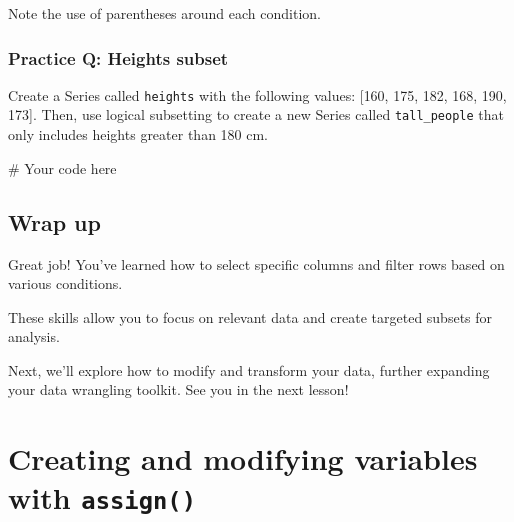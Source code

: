 \documentclass[
  letterpaper,
  DIV=11,
  numbers=noendperiod]{scrreprt}
\newenvironment{Shaded}{\begin{snugshade}}{\end{snugshade}}
\newcommand{\CommentTok}[1]{\textcolor[rgb]{0.37,0.37,0.37}{#1}}
\begin{document}
Note the use of parentheses around each condition.

\begin{tcolorbox}[enhanced jigsaw, colframe=quarto-callout-tip-color-frame, opacityback=0, titlerule=0mm, bottomrule=.15mm, breakable, leftrule=.75mm, colbacktitle=quarto-callout-tip-color!10!white, title=\textcolor{quarto-callout-tip-color}{\faLightbulb}\hspace{0.5em}{Practice}, rightrule=.15mm, coltitle=black, opacitybacktitle=0.6, colback=white, left=2mm, arc=.35mm, toptitle=1mm, bottomtitle=1mm, toprule=.15mm]

\subsection{Practice Q: Heights subset}\label{practice-q-heights-subset}

Create a Series called \texttt{heights} with the following values:
{[}160, 175, 182, 168, 190, 173{]}. Then, use logical subsetting to
create a new Series called \texttt{tall\_people} that only includes
heights greater than 180 cm.

\begin{Shaded}
\begin{Highlighting}[]
\CommentTok{\# Your code here}
\end{Highlighting}
\end{Shaded}

\end{tcolorbox}

\section{Wrap up}\label{wrap-up-5}

Great job! You've learned how to select specific columns and filter rows
based on various conditions.

These skills allow you to focus on relevant data and create targeted
subsets for analysis.

Next, we'll explore how to modify and transform your data, further
expanding your data wrangling toolkit. See you in the next lesson!

\chapter{\texorpdfstring{Creating and modifying variables with
\texttt{assign()}}{Creating and modifying variables with assign()}}\label{creating-and-modifying-variables-with-assign}
\end{document}
